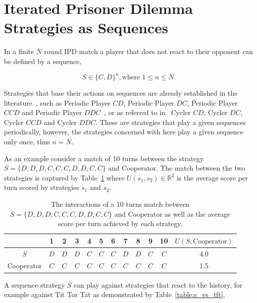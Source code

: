 \section{Iterated Prisoner Dilemma Strategies as Sequences}\label{section:ipd_as_sequences}

In a finite \(N\) round IPD match a player that does not react to their opponent
can be defined by a sequence,

\begin{equation}
    S \in \{C, D\} ^ n, \text{where } 1 \leq n \leq N.
\end{equation}

Strategies that base their actions on sequences are already established in the
literature~\cite{Beaufils1997}, such as Periodic Player \(CD\), Periodic Player \(DC\),
Periodic Player \(CCD\) and Periodic Player \(DDC\)~\cite{Li2011, Mittal2009},
or as referred to in~\cite{Knight2016} Cycler \(CD\), Cycler \(DC\),
Cycler \(CCD\) and Cycler \(DDC\). These are strategies that play a given sequences
periodically, however, the strategies concerned with here play a given
sequence only once, thus \(n = N\).

As an example consider a match of 10 turns between the strategy \(S = \{D, D, D,
C, C, C, D, D, C, C\}\) and Cooperator. The match between the two strategies
is captured by Table~\ref{table:s_vs_cooperator} where \(U(s_1, s_2)\in
\mathbb{R}^2\) is the average score per turn scored by strategies \(s_1\) and
\(s_2\).

\begin{table}[htb]
\centering
\begin{tabular}{cccccccccccc}
    & \textbf{1} & \textbf{2} & \textbf{3} & \textbf{4}  & \textbf{5} & \textbf{6} & \textbf{7} & \textbf{8}  & \textbf{9} & \textbf{10} & 
    \(U(S, \text{Cooperator})\) \\ \midrule
    \(S\) & \(D\) & \(D\) & \(D\) & \(C\) & \(C\) & \(C\) & \(D\) & \(D\) & \(C\) & \(C\) & 4.0 \\
    Cooperator & \(C\) & \(C\) & \(C\) & \(C\) & \(C\) & \(C\) & \(C\) & \(C\) & \(C\) & \(C\) & 1.5 \\ \bottomrule
\end{tabular}
\caption{The interactions of a 10 turns match between \(S = \{D, D, D, C, C, C, D, D, C, C\}\) and
Cooperator as well as the average score per turn achieved by each strategy.}\label{table:s_vs_cooperator}
\end{table}

A sequence strategy \(S\) can play against strategies that react to the history,
for example against Tit Tor Tat as demonstrated by Table~\ref{table:s_vs_tft},

